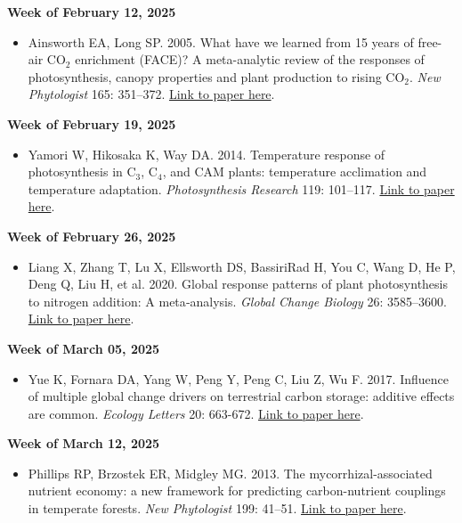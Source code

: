 \documentclass[12pt, notitlepage]{article}   	%
\begin{document}
{\textbf{Week of February 12, 2025}
\begin{itemize}
    \item Ainsworth EA, Long SP. 2005. What have we learned from 15 years of free-air CO$_2$ enrichment (FACE)? A meta-analytic review of the responses of photosynthesis, canopy properties and plant production to rising CO$_2$. \textit{New Phytologist} 165: 351–372. \href{https://nph.onlinelibrary.wiley.com/doi/10.1111/j.1469-8137.2004.01224.x}{Link to paper here}.
\end{itemize}
\newpage
\textbf{Week of February 19, 2025}
\begin{itemize}
    \item Yamori W, Hikosaka K, Way DA. 2014. Temperature response of photosynthesis in C$_3$, C$_4$, and CAM plants: temperature acclimation and temperature adaptation. \textit{Photosynthesis Research} 119: 101–117. \href{https://link.springer.com/article/10.1007/s11120-013-9874-6}{Link to paper here}.
\end{itemize}

\textbf{Week of February 26, 2025}
\begin{itemize}
    \item Liang X, Zhang T, Lu X, Ellsworth DS, BassiriRad H, You C, Wang D, He P, Deng Q, Liu H, et al. 2020. Global response patterns of plant photosynthesis to nitrogen addition: A meta‐analysis. \textit{Global Change Biology} 26: 3585–3600. \href{https://onlinelibrary.wiley.com/doi/full/10.1111/gcb.15071}{Link to paper here}.
\end{itemize}

\textbf{Week of March 05, 2025}
\begin{itemize}
    \item Yue K, Fornara DA, Yang W, Peng Y, Peng C, Liu Z, Wu F. 2017. Influence of multiple global change drivers on terrestrial carbon storage: additive effects are common. \textit{Ecology Letters} 20: 663-672. \href{https://onlinelibrary.wiley.com/doi/full/10.1111/ele.12767}{Link to paper here}.
\end{itemize}

\textbf{Week of March 12, 2025}
\begin{itemize}
    \item Phillips RP, Brzostek ER, Midgley MG. 2013. The mycorrhizal-associated nutrient economy: a new framework for predicting carbon-nutrient couplings in temperate forests. \textit{New Phytologist} 199: 41–51. \href{https://nph.onlinelibrary.wiley.com/doi/full/10.1111/nph.12221}{Link to paper here}.
\end{itemize}

}
\end{document}
